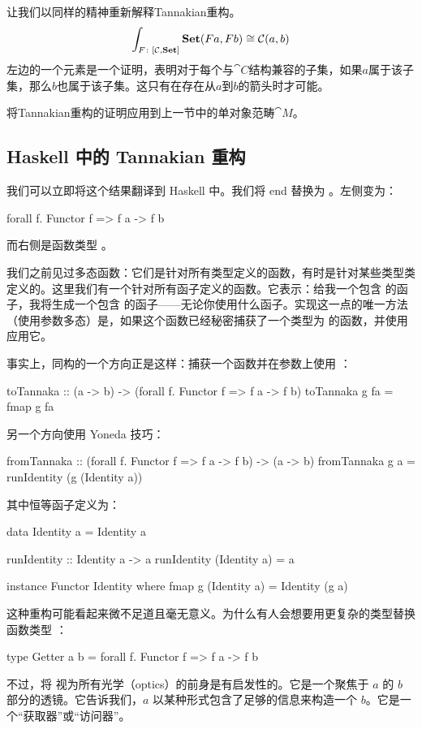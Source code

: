 \documentclass[DaoFP]{subfiles}
\begin{document}
让我们以同样的精神重新解释Tannakian重构。
\[ \int_{F \colon [\mathcal{C}, \mathbf{Set}]} \mathbf{Set} (F a, F b) \cong \mathcal{C}(a, b) \]
左边的一个元素是一个证明，表明对于每个与$\cat C$结构兼容的子集，如果$a$属于该子集，那么$b$也属于该子集。这只有在存在从$a$到$b$的箭头时才可能。

\begin{exercise}
将Tannakian重构的证明应用到上一节中的单对象范畴$\cat M$。
\end{exercise}

\subsection{Haskell 中的 Tannakian 重构}

我们可以立即将这个结果翻译到 Haskell 中。我们将 end 替换为 。左侧变为：
\begin{haskell}
forall f. Functor f => f a -> f b
\end{haskell}
而右侧是函数类型 。

我们之前见过多态函数：它们是针对所有类型定义的函数，有时是针对某些类型类定义的。这里我们有一个针对所有函子定义的函数。它表示：给我一个包含  的函子，我将生成一个包含  的函子——无论你使用什么函子。实现这一点的唯一方法（使用参数多态）是，如果这个函数已经秘密捕获了一个类型为  的函数，并使用  应用它。

事实上，同构的一个方向正是这样：捕获一个函数并在参数上使用 ：
\begin{haskell}
toTannaka :: (a -> b) -> (forall f. Functor f => f a -> f b)
toTannaka g fa = fmap g fa
\end{haskell}
另一个方向使用 Yoneda 技巧：
\begin{haskell}
fromTannaka :: (forall f. Functor f => f a -> f b) -> (a -> b)
fromTannaka g a = runIdentity (g (Identity a))
\end{haskell}
其中恒等函子定义为：
\begin{haskell}
data Identity a = Identity a 
  
runIdentity :: Identity a -> a
runIdentity (Identity a) = a

instance Functor Identity where
  fmap g (Identity a) = Identity (g a)
\end{haskell}

这种重构可能看起来微不足道且毫无意义。为什么有人会想要用更复杂的类型替换函数类型 ：
\begin{haskell}
type Getter a b = forall f. Functor f => f a -> f b
\end{haskell}
不过，将  视为所有光学（optics）的前身是有启发性的。它是一个聚焦于 $a$ 的 $b$ 部分的透镜。它告诉我们，$a$ 以某种形式包含了足够的信息来构造一个 $b$。它是一个“获取器”或“访问器”。
\end{document}
